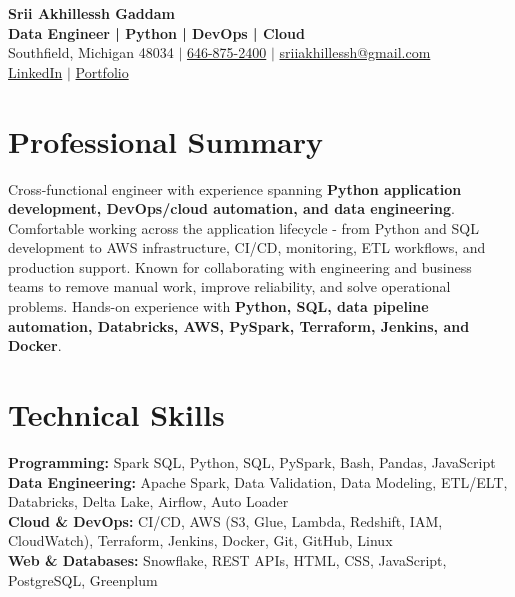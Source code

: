 \documentclass[letterpaper,10pt]{article}
\begin{document}
\fontsize{9.35pt}{10.45pt}\selectfont

\begin{center}
    {\LARGE \textbf{Srii Akhillessh Gaddam}} \\[-1pt]
    \textbf{Data Engineer | Python | DevOps | Cloud} \\[2pt]
    Southfield, Michigan 48034 $|$
    \href{tel:6468752400}{646-875-2400} $|$
    \href{mailto:sriiakhillessh@gmail.com}{sriiakhillessh@gmail.com} \\[1pt]
    \href{https://www.linkedin.com/in/srii-akhiilessh-gaddam-b48668191/}{LinkedIn} $|$
    \href{https://sriiakhillesshg.github.io/portfolio/}{Portfolio}
\end{center}
\vspace{-8pt}

\section{Professional Summary}
\small{Cross-functional engineer with experience spanning \textbf{Python application development, DevOps/cloud automation, and data engineering}. Comfortable working across the application lifecycle - from Python and SQL development to AWS infrastructure, CI/CD, monitoring, ETL workflows, and production support. Known for collaborating with engineering and business teams to remove manual work, improve reliability, and solve operational problems. Hands-on experience with \textbf{Python, SQL, data pipeline automation, Databricks, AWS, PySpark, Terraform, Jenkins, and Docker}.}

\section{Technical Skills}
\small{
\textbf{Programming:} Spark SQL, Python, SQL, PySpark, Bash, Pandas, JavaScript \\
\textbf{Data Engineering:} Apache Spark, Data Validation, Data Modeling, ETL/ELT, Databricks, Delta Lake, Airflow, Auto Loader \\
\textbf{Cloud \& DevOps:} CI/CD, AWS (S3, Glue, Lambda, Redshift, IAM, CloudWatch), Terraform, Jenkins, Docker, Git, GitHub, Linux \\
\textbf{Web \& Databases:} Snowflake, REST APIs, HTML, CSS, JavaScript, PostgreSQL, Greenplum
}

\end{document}
